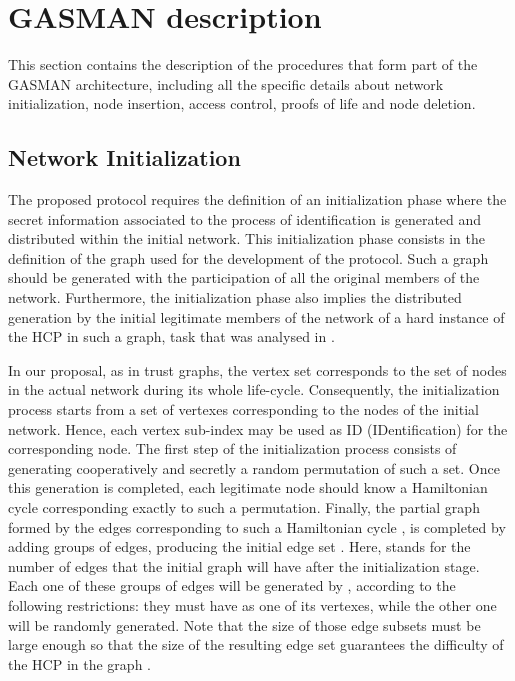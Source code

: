 \documentclass{article}
\begin{document}
\section{GASMAN description}
\label{ElementsDescription}
This section contains the description of the procedures that form part of the GASMAN architecture, including all the specific details
about network initialization, node insertion, access control,
proofs of life and node deletion.
\subsection{Network Initialization}

The proposed protocol requires the
definition of an initialization phase where the secret information
associated to the process of identification is generated and
distributed within the initial network. This initialization phase
consists in the definition of the graph used for the development
of the protocol. Such a graph should be generated with the participation of all the original members of the
network. Furthermore, the initialization phase also implies the distributed generation by the initial legitimate members of the network of a hard instance of the HCP in such a graph, task that was analysed in \cite{KWBF03}.

In our proposal, as in trust graphs, the vertex set corresponds to the set of nodes in the actual network during its whole life-cycle. Consequently, the initialization process starts from a set  of 
vertexes corresponding to the nodes of the initial network.
Hence, each vertex sub-index may be used as ID
(IDentification) for the corresponding node. The first step of the
initialization process consists of generating cooperatively and secretly
a random permutation  of such a set. Once this generation is
completed, each legitimate node should know a Hamiltonian cycle
 corresponding exactly to such a permutation. Finally, the
partial graph formed by the edges corresponding to such a
Hamiltonian cycle , is completed by adding  groups of
 edges, producing the initial edge set . Here,  stands for the number of edges that the initial graph will have after the initialization stage. Each one of these  groups of edges will be generated by ,  according to the following restrictions: they must have  as one of its vertexes,
while the other one will be randomly generated. Note
that the size  of those edge subsets must
be large enough so that the size of the resulting edge set
 guarantees the difficulty of the HCP in
the graph .
\end{document}
